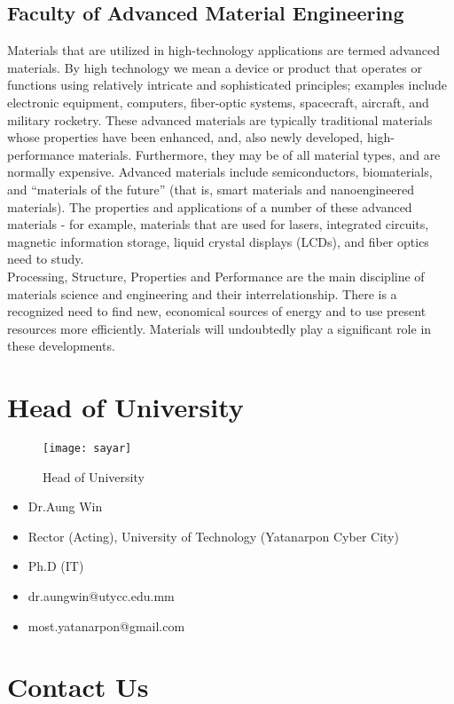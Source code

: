\documentclass[conference]{IEEEtran}
\begin{document}
\subsection{Faculty of Advanced Material Engineering}
Materials that are utilized in high-technology applications are termed advanced materials. By high technology we mean a device or product that operates or functions using relatively intricate and sophisticated principles; examples include electronic equipment, computers, fiber-optic systems, spacecraft, aircraft, and military rocketry. These advanced materials are typically traditional materials whose properties have been enhanced, and, also newly developed, high-performance materials. Furthermore, they may be of all material types, and are normally expensive. Advanced materials include semiconductors, biomaterials, and “materials of the future” (that is, smart materials and nanoengineered materials). The properties and applications of a number of these advanced materials - for example, materials that are used for lasers, integrated circuits, magnetic information storage, liquid crystal displays (LCDs), and fiber optics need to study.\\
Processing, Structure, Properties and Performance are the main discipline of materials science and engineering and their interrelationship. There is a recognized need to find new, economical sources of energy and to use present resources more efficiently. Materials will undoubtedly play a significant role in these developments.

\section{Head of University}

\begin{figure}[h]
\centering
\texttt{[image: sayar]}
\caption{Head of University}
\end{figure}
\begin{itemize}
\item Dr.Aung Win
\item Rector (Acting), University of Technology (Yatanarpon Cyber City)
\item Ph.D (IT)
\item dr.aungwin@utycc.edu.mm
\item most.yatanarpon@gmail.com
\end{itemize}

\section*{Contact Us}
\noindent{}
\end{document}
